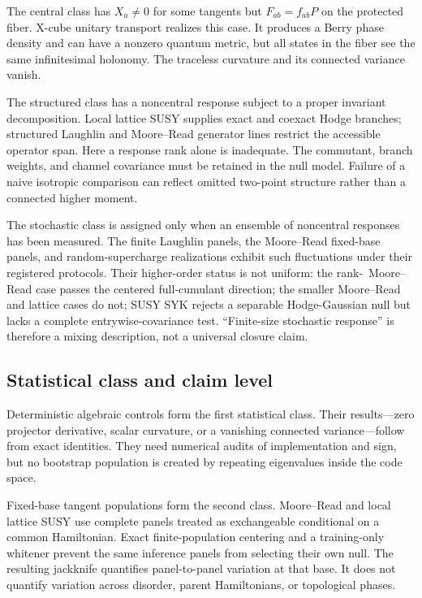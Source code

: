 The central class has $X_a\neq0$ for some tangents but
$F_{ab}=f_{ab}P$ on the protected fiber.  X-cube unitary transport realizes
this case.  It produces a Berry phase density and can have a nonzero quantum
metric, but all states in the fiber see the same infinitesimal holonomy.  The
traceless curvature and its connected variance vanish.

The structured class has a noncentral response subject to a proper invariant
decomposition.  Local lattice SUSY supplies exact and coexact Hodge branches;
structured Laughlin and Moore--Read generator lines restrict the accessible
operator span.  Here a response rank alone is inadequate.  The commutant,
branch weights, and channel covariance must be retained in the null model.
Failure of a naive isotropic comparison can reflect omitted two-point
structure rather than a connected higher moment.

The stochastic class is assigned only when an ensemble of noncentral
responses has been measured.  The finite Laughlin panels, the Moore--Read
fixed-base panels, and random-supercharge realizations exhibit such
fluctuations under their registered protocols.  Their higher-order status is
not uniform: the rank-\MooreReadNSixRank\ Moore--Read case passes the centered
full-cumulant direction; the smaller Moore--Read and lattice cases do not;
SUSY SYK rejects a separable Hodge-Gaussian null but lacks a complete
entrywise-covariance test.  ``Finite-size stochastic response'' is therefore
a mixing description, not a universal closure claim.

\subsection{Statistical class and claim level}

Deterministic algebraic controls form the first statistical class.  Their
results---zero projector derivative, scalar curvature, or a vanishing
connected variance---follow from exact identities.  They need numerical
audits of implementation and sign, but no bootstrap population is created by
repeating eigenvalues inside the code space.

Fixed-base tangent populations form the second class.  Moore--Read and local
lattice SUSY use complete panels treated as exchangeable conditional on a
common Hamiltonian.  Exact finite-population centering and a training-only
whitener prevent the same inference panels from selecting their own null.
The resulting jackknife quantifies panel-to-panel variation at that base.  It
does not quantify variation across disorder, parent Hamiltonians, or
topological phases.

